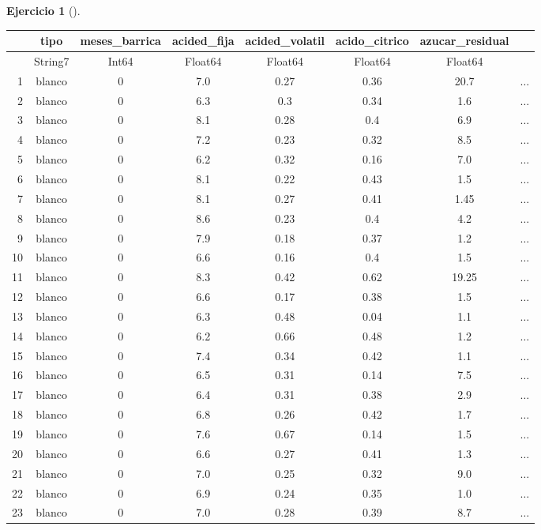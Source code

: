 \documentclass[
  a4paper,
]{scrreport}
\theoremstyle{definition}
\newtheorem{exercise}{Ejercicio}[chapter]
\theoremstyle{remark}
\begin{document}
\begin{exercise}[]
\begin{enumerate}
\begin{tcolorbox}
  \begin{tabular}{r|ccccccc}
      & tipo & meses\_barrica & acided\_fija & acided\_volatil & acido\_citrico & azucar\_residual & \\
      \hline
      & String7 & Int64 & Float64 & Float64 & Float64 & Float64 & \\
      \hline
      1 & blanco & 0 & 7.0 & 0.27 & 0.36 & 20.7 & $\dots$ \\
      2 & blanco & 0 & 6.3 & 0.3 & 0.34 & 1.6 & $\dots$ \\
      3 & blanco & 0 & 8.1 & 0.28 & 0.4 & 6.9 & $\dots$ \\
      4 & blanco & 0 & 7.2 & 0.23 & 0.32 & 8.5 & $\dots$ \\
      5 & blanco & 0 & 6.2 & 0.32 & 0.16 & 7.0 & $\dots$ \\
      6 & blanco & 0 & 8.1 & 0.22 & 0.43 & 1.5 & $\dots$ \\
      7 & blanco & 0 & 8.1 & 0.27 & 0.41 & 1.45 & $\dots$ \\
      8 & blanco & 0 & 8.6 & 0.23 & 0.4 & 4.2 & $\dots$ \\
      9 & blanco & 0 & 7.9 & 0.18 & 0.37 & 1.2 & $\dots$ \\
      10 & blanco & 0 & 6.6 & 0.16 & 0.4 & 1.5 & $\dots$ \\
      11 & blanco & 0 & 8.3 & 0.42 & 0.62 & 19.25 & $\dots$ \\
      12 & blanco & 0 & 6.6 & 0.17 & 0.38 & 1.5 & $\dots$ \\
      13 & blanco & 0 & 6.3 & 0.48 & 0.04 & 1.1 & $\dots$ \\
      14 & blanco & 0 & 6.2 & 0.66 & 0.48 & 1.2 & $\dots$ \\
      15 & blanco & 0 & 7.4 & 0.34 & 0.42 & 1.1 & $\dots$ \\
      16 & blanco & 0 & 6.5 & 0.31 & 0.14 & 7.5 & $\dots$ \\
      17 & blanco & 0 & 6.4 & 0.31 & 0.38 & 2.9 & $\dots$ \\
      18 & blanco & 0 & 6.8 & 0.26 & 0.42 & 1.7 & $\dots$ \\
      19 & blanco & 0 & 7.6 & 0.67 & 0.14 & 1.5 & $\dots$ \\
      20 & blanco & 0 & 6.6 & 0.27 & 0.41 & 1.3 & $\dots$ \\
      21 & blanco & 0 & 7.0 & 0.25 & 0.32 & 9.0 & $\dots$ \\
      22 & blanco & 0 & 6.9 & 0.24 & 0.35 & 1.0 & $\dots$ \\
      23 & blanco & 0 & 7.0 & 0.28 & 0.39 & 8.7 & $\dots$ \\

\end{tabular}
\end{tcolorbox}
\end{enumerate}
\end{exercise}
\end{document}
